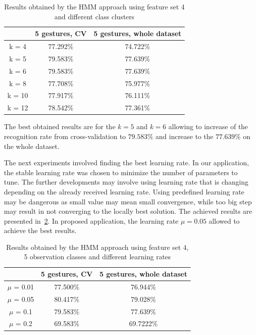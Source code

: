 \begin{table}[htp!]
	\label{tab:dyn1}
	\caption{Results obtained by the HMM approach using feature set 4 and different class clusters}
    \begin{tabular}{|c|c|c|}
    \hline
    ~                                 & 5 gestures, CV & 5 gestures, whole dataset  \\ \hline
	k = 4                  	  & 77.292\% & 74.722\%   \\ \hline
    k = 5               	  & 79.583\% & 77.639\%   \\ \hline
    k = 6                     & 79.583\% & 77.639\%   \\ \hline
    k = 8                     & 77.708\% & 75.977\%   \\ \hline
    k = 10                    & 77.917\% & 76.111\%   \\ \hline
    k = 12                    & 78.542\% & 77.361\%   \\ \hline
    \end{tabular}
\end{table}
The best obtained results are for the $k=5$ and $k=6$ allowing to increase of the recognition rate from cross-validation to $79.583\%$ and increase to the $77.639\%$ on the whole dataset. 

The next experiments involved finding the best learning rate. 
In our application, the stable learning rate was chosen to minimize the number of parameters to tune. 
The further developments may involve using learning rate that is changing depending on the already received learning rate.
Using predefined learning rate may be dangerous as small value may mean small convergence, while too big step may result in not converging to the locally best solution. 
The achieved results are presented in~\ref{tab:dyn2}.
In proposed application, the learning rate $\mu = 0.05$ allowed to achieve the best results. 

\begin{table}[htp!]
	\label{tab:dyn2}
	\caption{Results obtained by the HMM approach using feature set 4, 5 observation classes and different learning rates}
    \begin{tabular}{|c|c|c|}
    \hline
    ~                                 & 5 gestures, CV & 5 gestures, whole dataset  \\ \hline
	$\mu$ = 0.01                  	  & 77.500\% & 76.944\%   \\ \hline
    $\mu$ = 0.05                      & 80.417\% & 79.028\%   \\ \hline
    $\mu$ = 0.1                      & 79.583\% & 77.639\%   \\ \hline
    $\mu$ = 0.2                      & 69.583\% & 69.7222\%   \\ \hline
    \end{tabular}
\end{table}



